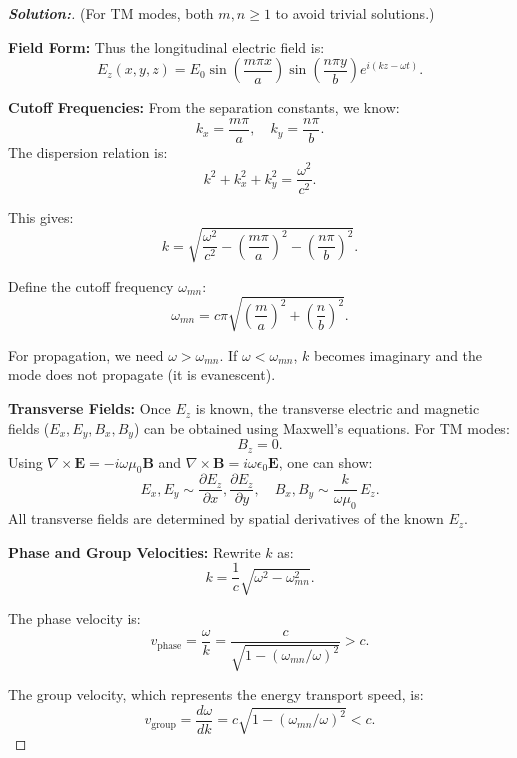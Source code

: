 \documentclass[12pt]{article}
\theoremstyle{definition}\newtheorem{problem}{Problem}
\newenvironment{solution}{\begin{proof}[\bfseries\textup{Solution:}]}{\end{proof}}
\begin{document}
\begin{solution}
    \noindent
    (For TM modes, both $m,n \geq 1$ to avoid trivial solutions.)
    
    \noindent
    \textbf{Field Form:}  
    Thus the longitudinal electric field is:
    \[
    E_z(x,y,z) = E_0 \sin\left(\frac{m \pi x}{a}\right)\sin\left(\frac{n \pi y}{b}\right)e^{i(kz-\omega t)}.
    \]
    
    \noindent
    \textbf{Cutoff Frequencies:}  
    From the separation constants, we know:
    \[
    k_x=\frac{m \pi}{a}, \quad k_y=\frac{n \pi}{b}.
    \]
    The dispersion relation is:
    \[
    k^2 + k_x^2 + k_y^2 = \frac{\omega^2}{c^2}.
    \]
    
    This gives:
    \[
    k = \sqrt{\frac{\omega^2}{c^2} - \left(\frac{m\pi}{a}\right)^2 - \left(\frac{n\pi}{b}\right)^2}.
    \]
    
    Define the cutoff frequency $\omega_{mn}$:
    \[
    \omega_{mn} = c\pi \sqrt{\left(\frac{m}{a}\right)^2 + \left(\frac{n}{b}\right)^2}.
    \]
    
    For propagation, we need $\omega > \omega_{mn}$. If $\omega < \omega_{mn}$, $k$ becomes imaginary and the mode does not propagate (it is evanescent).
    
    \noindent
    \textbf{Transverse Fields:}  
    Once $E_z$ is known, the transverse electric and magnetic fields ($E_x,E_y,B_x,B_y$) can be obtained using Maxwell’s equations. For TM modes:
    \[
    B_z = 0.
    \]
    Using $\nabla \times \mathbf{E} = -i\omega \mu_0 \mathbf{B}$ and $\nabla \times \mathbf{B} = i\omega \epsilon_0 \mathbf{E}$, one can show:
    \[
    E_x, E_y \sim \frac{\partial E_z}{\partial x}, \frac{\partial E_z}{\partial y}, \quad B_x, B_y \sim \frac{k}{\omega \mu_0}\, E_z.
    \]
    All transverse fields are determined by spatial derivatives of the known $E_z$.
    
    \noindent
    \textbf{Phase and Group Velocities:}  
    Rewrite $k$ as:
    \[
    k=\frac{1}{c}\sqrt{\omega^2 - \omega_{mn}^2}.
    \]
    
    The phase velocity is:
    \[
    v_{\text{phase}} = \frac{\omega}{k} = \frac{c}{\sqrt{1-(\omega_{mn}/\omega)^2}} > c.
    \]
    
    The group velocity, which represents the energy transport speed, is:
    \[
    v_{\text{group}} = \frac{d\omega}{dk} = c\sqrt{1-(\omega_{mn}/\omega)^2} < c.
    \]
    



\end{solution}
\end{document}
